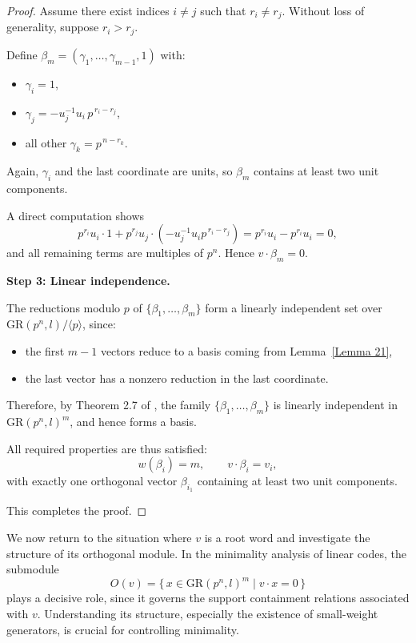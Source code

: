 \documentclass[10pt]{article}
\theoremstyle{definition}
\begin{document}
\begin{proof}
Assume there exist indices $i\neq j$ such that
$r_i\neq r_j$.
Without loss of generality, suppose $r_i>r_j$.

Define $\beta_m=(\gamma_1,\dots,\gamma_{m-1},1)$ with:

\begin{itemize}
\item $\gamma_i=1$,
\item $\gamma_j=-u_j^{-1}u_i\,p^{\,r_i-r_j}$,
\item all other $\gamma_k=p^{\,n-r_k}$.
\end{itemize}

Again, $\gamma_i$ and the last coordinate are units,
so $\beta_m$ contains at least two unit components.

A direct computation shows
\[
p^{r_i}u_i\cdot 1
+
p^{r_j}u_j\cdot(-u_j^{-1}u_i p^{\,r_i-r_j})
=
p^{r_i}u_i - p^{r_i}u_i
=0,
\]
and all remaining terms are multiples of $p^n$.
Hence $v\cdot \beta_m=0$.

\medskip
\noindent
\textbf{Step 3: Linear independence.}

The reductions modulo $p$ of
$\{\beta_1,\dots,\beta_m\}$
form a linearly independent set over
$\mathrm{GR}(p^n,l)/\langle p\rangle$,
since:

\begin{itemize}
\item the first $m-1$ vectors reduce to a basis
      coming from Lemma~\ref{Lemma 21},
\item the last vector has a nonzero reduction in the last coordinate.
\end{itemize}

Therefore, by Theorem 2.7 of \cite{NortonSalagean},
the family $\{\beta_1,\dots,\beta_m\}$
is linearly independent in $\mathrm{GR}(p^n,l)^m$,
and hence forms a basis.

\medskip

All required properties are thus satisfied:
\[
w(\beta_i)=m,\qquad
v\cdot \beta_i=v_i,
\]
with exactly one orthogonal vector $\beta_{i_1}$
containing at least two unit components.

This completes the proof.
\end{proof}

\medskip

We now return to the situation where $v$ is a root word and
investigate the structure of its orthogonal module.
In the minimality analysis of linear codes,
the submodule
\[
O(v)=\{\,x\in \mathrm{GR}(p^n,l)^m \mid v\cdot x=0\,\}
\]
plays a decisive role, since it governs the support containment
relations associated with $v$.
Understanding its structure, especially the existence of
small-weight generators, is crucial for controlling minimality.
\end{document}
